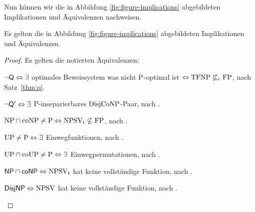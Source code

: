 Nun können wir die in Abbildung \ref{fig:figure-implications} abgebildeten Implikationen und Äquivalenzen nachweisen.
\begin{theorem}\label{thm:figure-implications}
    Es gelten die in Abbildung \ref{fig:figure-implications} abgebildeten Implikationen und Äquivalenzen.
\end{theorem}
\begin{proof}
    Es gelten die notierten Äquivalenzen:
    \begin{Prooflist}[noitemsep, midpenalty=0,label={\arabic*.},labelsep=3pt]
    \item $\neg\hQ \Leftrightarrow \exists$ optimales Beweissystem was nicht $\P$-optimal ist $\Leftrightarrow \TFNP\not\subseteq_\mathrm{c} \FP$, nach Satz~\ref{thm:q}.
    \item $\neg\hQ' \Leftrightarrow\exists$ P-inseparierbares $\DisjCoNP$-Paar, nach \textcite[Lemma~2.12, vgl. Appendix]{fortnow_separability_1993}.
    \item $\NP\cap\coNP\neq\P \Leftrightarrow \NPSVt\not\subseteq\FP$, nach \textcite[Prop.~1]{fenner_inverting_2003}.
    \item $\UP\neq\P \Leftrightarrow\exists$ Einwegfunktionen, nach \textcite[Thm.~10]{grollmann_complexity_1988}.
    \item $\UP\cap\coUP\neq\P \Leftrightarrow\exists$ Einwegpermutationen, nach \textcite{homan_one-way_2003}.
    \item $\hNPcoNP \Leftrightarrow \NPSV_t$ hat keine vollständige Funktion, nach \textcite[Prop.~3]{beyersdorff_nondeterministic_2009}.
    \item $\hDisjNP \Leftrightarrow \NPSV$ hat keine vollständige Funktion, nach \textcite[Thm.~9]{glaser_reductions_2005}.
    \end{Prooflist}


\end{proof}
